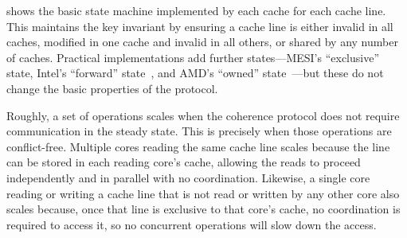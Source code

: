 \begin{figure}
  \centering
  \label{fig:mesi}
\end{figure}

 shows the basic state machine implemented by each
cache for each cache line.  This maintains the key invariant by
ensuring a cache line is either invalid in all caches, modified in one
cache and invalid in all others, or shared by any number of caches.
Practical implementations add further states---MESI's ``exclusive''
state, Intel's ``forward'' state~\cite{goodman:mesif}, and AMD's
``owned'' state~\cite[\S7.3]{amd-arch-2}---but these do not change the
basic properties of the protocol.

Roughly, a set of operations scales when the coherence protocol does
not require communication in the steady state.  This is precisely when
those operations are conflict-free.  Multiple cores reading the same
cache line scales because the line can be stored in each reading
core's cache, allowing the reads to proceed independently and in
parallel with no coordination.  Likewise, a single core reading or
writing a cache line that is not read or written by any other core
also scales because, once that line is exclusive to that core's cache,
no coordination is required to access it, so no concurrent operations
will slow down the access.

